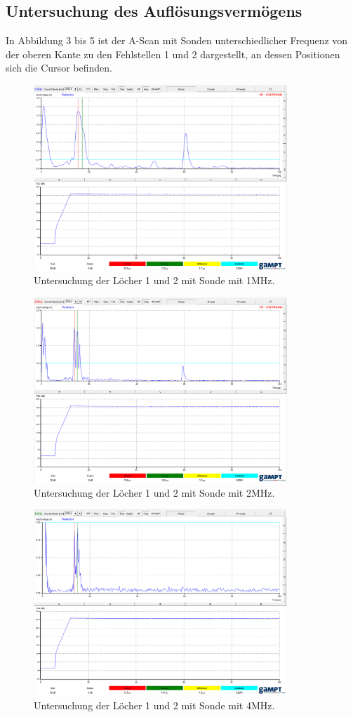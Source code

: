 \subsection{Untersuchung des Auflösungsvermögens}
In Abbildung 3 bis 5 ist der A-Scan mit Sonden unterschiedlicher Frequenz
von der oberen Kante zu den Fehlstellen 1 und 2 dargestellt, an dessen Positionen
sich die Cursor befinden.

\begin{figure}[H]
  \centering
  \includegraphics[height=7cm]{1mhz.png}
  \caption{Untersuchung der Löcher 1 und 2 mit Sonde mit 1MHz.}
  \label{fig:1mhz}
\end{figure}

\begin{figure}[H]
  \centering
  \includegraphics[height=7cm]{2mhz.png}
  \caption{Untersuchung der Löcher 1 und 2 mit Sonde mit 2MHz.}
  \label{fig:2mhz}
\end{figure}

\begin{figure}[H]
  \centering
  \includegraphics[height=7cm]{4mhz.png}
  \caption{Untersuchung der Löcher 1 und 2 mit Sonde mit 4MHz.}
  \label{fig:4mhz}
\end{figure}


